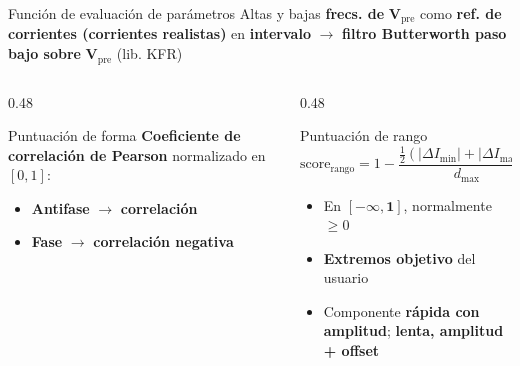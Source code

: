 \documentclass[10pt, aspectratio=169]{beamer}
\begin{document}
\begin{frame}{Función de evaluación de parámetros}
    Altas y bajas \textbf{frecs. de} $\boldsymbol{V_{\mathrm{pre}}}$ como \textbf{ref. de corrientes (corrientes realistas)} en \textbf{intervalo} $\to$ \textbf{filtro Butterworth paso bajo sobre} $\boldsymbol{V_{\mathrm{pre}}}$ (lib. KFR)
    \vspace{-1em}
    \begin{center}
        \begin{columns}[t, onlytextwidth]
            \begin{column}{0.48\textwidth}
                \begin{block}{Puntuación de forma}
                    \small
                    \textbf{Coeficiente de correlación de Pearson} normalizado en $[0, 1]$:
                    \begin{itemize}
                        \item \textbf{Antifase} $\to$ \textbf{correlación}
                        \item \textbf{Fase} $\to$ \textbf{correlación negativa}
                    \end{itemize}
                \end{block}
            \end{column}
            \begin{column}{0.48\textwidth}
                \begin{block}{Puntuación de rango}
                    \small
                    \begin{equation*}
                        \mathrm{score}_{\mathrm{rango}} = 1 - \frac{\frac{1}{2}(|\Delta I_{\min}| + |\Delta I_{\max}|)}{d_{\max}}
                    \end{equation*}
                    \begin{itemize}
                        \item En $\boldsymbol{[-\infty, 1]}$, normalmente $\ge 0$
                        \item \textbf{Extremos objetivo} del usuario
                        \item Componente \textbf{rápida con amplitud}; \textbf{lenta, amplitud + offset}
                    \end{itemize}
                \end{block}
            \end{column}
        \end{columns}
        \vspace{0.8em}
    \end{center}
\end{frame}
\end{document}
